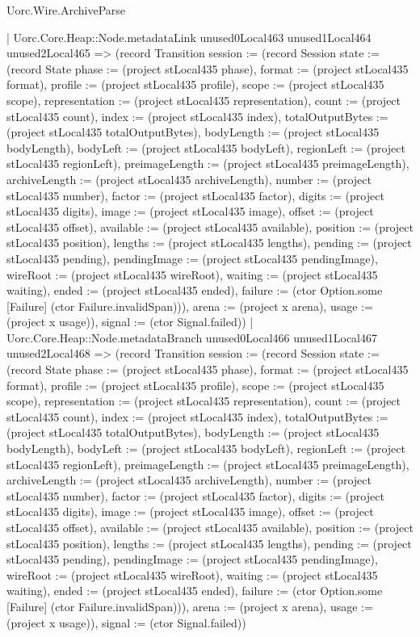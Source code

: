 \begin{lexlean}{Uorc.Wire.ArchiveParse}
\begin{semanticmodule}
{        | Uorc.Core.Heap::Node.metadataLink unused0Local463 unused1Local464 unused2Local465 => (record Transition {session := (record Session {state := (record State {phase := (project stLocal435 phase), format := (project stLocal435 format), profile := (project stLocal435 profile), scope := (project stLocal435 scope), representation := (project stLocal435 representation), count := (project stLocal435 count), index := (project stLocal435 index), totalOutputBytes := (project stLocal435 totalOutputBytes), bodyLength := (project stLocal435 bodyLength), bodyLeft := (project stLocal435 bodyLeft), regionLeft := (project stLocal435 regionLeft), preimageLength := (project stLocal435 preimageLength), archiveLength := (project stLocal435 archiveLength), number := (project stLocal435 number), factor := (project stLocal435 factor), digits := (project stLocal435 digits), image := (project stLocal435 image), offset := (project stLocal435 offset), available := (project stLocal435 available), position := (project stLocal435 position), lengths := (project stLocal435 lengths), pending := (project stLocal435 pending), pendingImage := (project stLocal435 pendingImage), wireRoot := (project stLocal435 wireRoot), waiting := (project stLocal435 waiting), ended := (project stLocal435 ended), failure := (ctor Option.some [Failure] (ctor Failure.invalidSpan))}), arena := (project x arena), usage := (project x usage)}), signal := (ctor Signal.failed)})
        | Uorc.Core.Heap::Node.metadataBranch unused0Local466 unused1Local467 unused2Local468 => (record Transition {session := (record Session {state := (record State {phase := (project stLocal435 phase), format := (project stLocal435 format), profile := (project stLocal435 profile), scope := (project stLocal435 scope), representation := (project stLocal435 representation), count := (project stLocal435 count), index := (project stLocal435 index), totalOutputBytes := (project stLocal435 totalOutputBytes), bodyLength := (project stLocal435 bodyLength), bodyLeft := (project stLocal435 bodyLeft), regionLeft := (project stLocal435 regionLeft), preimageLength := (project stLocal435 preimageLength), archiveLength := (project stLocal435 archiveLength), number := (project stLocal435 number), factor := (project stLocal435 factor), digits := (project stLocal435 digits), image := (project stLocal435 image), offset := (project stLocal435 offset), available := (project stLocal435 available), position := (project stLocal435 position), lengths := (project stLocal435 lengths), pending := (project stLocal435 pending), pendingImage := (project stLocal435 pendingImage), wireRoot := (project stLocal435 wireRoot), waiting := (project stLocal435 waiting), ended := (project stLocal435 ended), failure := (ctor Option.some [Failure] (ctor Failure.invalidSpan))}), arena := (project x arena), usage := (project x usage)}), signal := (ctor Signal.failed)})
}
\end{semanticmodule}
\end{lexlean}
